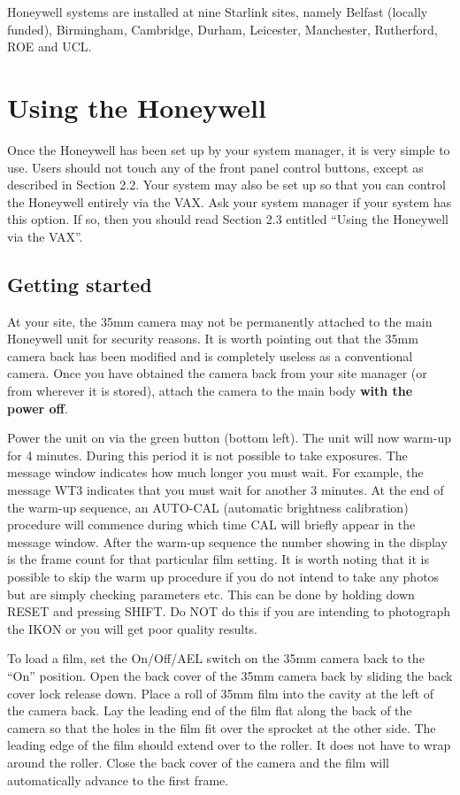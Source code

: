 Honeywell systems are installed at nine Starlink sites, namely Belfast
(locally funded), Birmingham, Cambridge, Durham, Leicester, Manchester,
Rutherford, ROE and UCL.

\section{Using the Honeywell}

Once the Honeywell has been set up by your system manager, it is very simple
to use. Users should not touch any of the front panel control buttons, except
as described in Section 2.2. Your system may also be set up so that
you can control the Honeywell entirely via the VAX. Ask your
system manager if your system has this option. If so, then you
should read Section 2.3 entitled ``Using the Honeywell via the VAX''.

\subsection{Getting started}

At your site, the 35mm camera may not be permanently attached to the main
Honeywell unit
for security reasons. It is worth pointing out that the 35mm camera back has
been modified and is completely useless as a conventional camera. Once
you have obtained the camera back from your site manager (or from wherever it
is stored), attach the camera to the main body {\bf with the power off}.

Power the unit on via the green button (bottom left). The unit will now
warm-up for 4 minutes. During this period it is not possible to take
exposures. The message window indicates how much longer you must wait. For example,
the message WT3 indicates that you must wait for another
3 minutes. At the end of the warm-up sequence, an AUTO-CAL (automatic
brightness calibration) procedure will commence during which time CAL will
briefly
appear in the message window.
After the warm-up sequence the number showing in the display is the frame count
for that particular film setting.
It is worth noting that it is possible to skip
the warm up procedure if you do not intend to take any photos but are simply
checking parameters etc. This can be done by holding down RESET and pressing
SHIFT. Do NOT do this if you are intending to photograph the IKON or you
will get poor quality results.

To load a film, set the On/Off/AEL switch on the 35mm
camera back to the ``On'' position. Open the back cover of the 35mm camera back
by sliding the back cover lock release down. Place a roll of 35mm film into the
cavity at the left of the camera back. Lay the leading end of the film flat
along the back of the camera so that the holes in the film fit over the
sprocket at the other side. The leading edge of the film should extend over to
the roller. It does not have to wrap around the roller. Close the back
cover of the camera and the film will automatically advance to the first frame.

